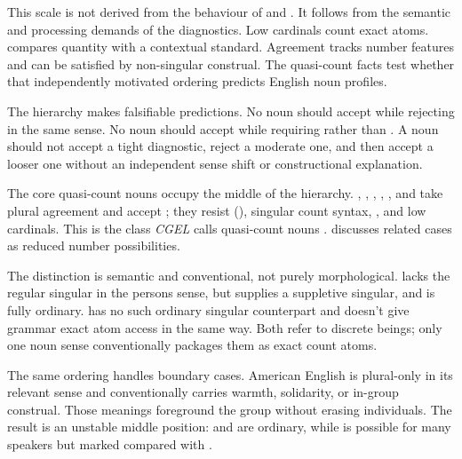 \documentclass[12pt,a4paper]{article}
\begin{document}
This scale is not derived from the behaviour of  and . It follows from the semantic and processing demands of the diagnostics. Low cardinals count exact atoms.  compares quantity with a contextual standard. Agreement tracks number features and can be satisfied by non-singular construal. The quasi-count facts test whether that independently motivated ordering predicts English noun profiles.





The hierarchy makes falsifiable predictions. No noun should accept  while rejecting  in the same sense. No noun should accept  while requiring  rather than . A noun should not accept a tight diagnostic, reject a moderate one, and then accept a looser one without an independent sense shift or constructional explanation.

The core quasi-count nouns occupy the middle of the hierarchy. , , , , , and  take plural agreement and accept ; they resist (), singular count syntax, , and low cardinals. This is the class \emph{CGEL} calls quasi-count nouns \citep[p.~345]{huddleston2002}. \textcite{corbett2019} discusses related cases as reduced number possibilities.

The distinction is semantic and conventional, not purely morphological.  lacks the regular singular  in the persons sense, but  supplies a suppletive singular, and  is fully ordinary.  has no such ordinary singular counterpart and doesn't give grammar exact atom access in the same way. Both refer to discrete beings; only one noun sense conventionally packages them as exact count atoms.

The same ordering handles boundary cases. American English  is plural-only in its relevant sense and conventionally carries warmth, solidarity, or in-group construal. Those meanings foreground the group without erasing individuals. The result is an unstable middle position:  and  are ordinary, while  is possible for many speakers but marked compared with .
\end{document}
